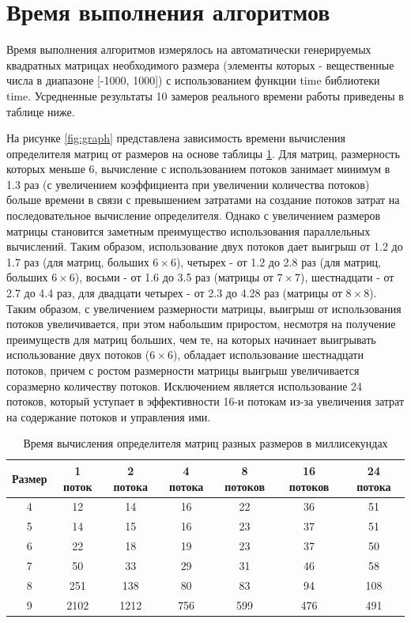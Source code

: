 \documentclass[a4paper,oneside,14pt]{extreport}
\begin{document}
\section{Время выполнения алгоритмов}
Время выполнения алгоритмов измерялось на автоматически генерируемых квадратных матрицах необходимого размера (элементы которых - вещественные числа в диапазоне [-1000, 1000]) с использованием функции time библиотеки time. Усредненные результаты 10 замеров реального времени работы приведены в таблице ниже.

На рисунке \ref{fig:graph} представлена зависимость времени вычисления определителя матриц от размеров на основе таблицы \ref{tab:time}. Для матриц, размерность которых меньше 6, вычисление с использованием потоков занимает минимум в 1.3 раз (с увеличением коэффициента при увеличении количества потоков) больше времени в связи с превышением затратами на создание потоков затрат на последовательное вычисление определителя. Однако с увеличением размеров матрицы становится заметным преимущество использования параллельных вычислений. Таким образом, использование двух потоков дает выигрыш от 1.2 до 1.7 раз (для матриц, больших $6\times6$), четырех - от 1.2 до 2.8 раз (для матриц, больших $6\times6$), восьми - от 1.6 до 3.5 раз (матрицы от $7\times7$), шестнадцати - от 2.7 до 4.4 раз, для двадцати четырех - от 2.3 до 4.28 раз (матрицы от $8\times8$). Таким образом, с увеличением размерности матрицы, выигрыш от использования потоков увеличивается, при этом набольшим приростом, несмотря на получение преимуществ для матриц больших, чем те, на которых начинает выигрывать использование двух потоков ($6\times6$), обладает использование шестнадцати потоков, причем с ростом размерности матрицы выигрыш увеличивается соразмерно количеству потоков. Исключением является использование 24 потоков, который уступает в эффективности 16-и потокам из-за увеличения затрат на содержание потоков и управления ими.
\begin{table}[H]
	\begin{center}
		\captionsetup{justification=raggedleft, singlelinecheck=false}
		\caption{\label{tab:time} Время вычисления определителя матриц разных размеров в миллисекундах}
		\begin{tabular}{|c c c c c c c|} 
			\hline
			Размер&1 поток&2 потока&4 потока&8 потоков&16 потоков&24 потока\\ [0.5ex]
			\hline
	   		   4 &   12 &   14 &   16 &   22 &   36 &   51
	   		\\ 
	   		\hline
	   		5 &   14 &   15 &   16 &   23 &   37 &   51
	   		\\ 
	   		\hline
	   		6 &   22 &   18 &   19 &   23 &   37 &   50
	   		\\ 
	   		\hline
	   		7 &   50 &   33 &   29 &   31 &   46 &   58
	   		\\ 
	   		\hline
	   		8 &  251 &  138 &   80 &   83 &   94 &  108
	   		\\ 
	   		\hline
	   		9 & 2102 & 1212 &  756 &  599 &  476 &  491
	   		\\ 
	   		\hline
		\end{tabular}
	\end{center}
\end{table}
\end{document}
